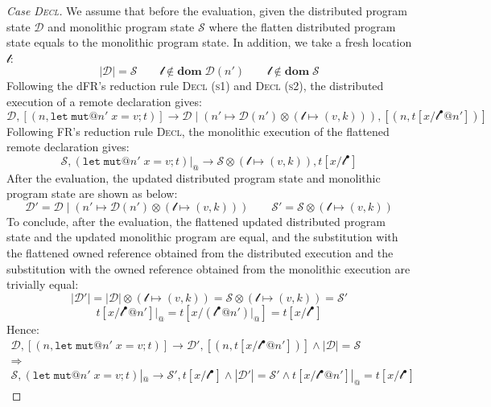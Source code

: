 \begin{proof}[Case \textsc{\emph{Decl}}]
We assume that before the evaluation, given the distributed program state $\mathcal{D}$ and monolithic program state $\mathcal{S}$ where the flatten distributed program state equals to the monolithic program state. In addition, we take a fresh location $\mathscr{l}$:
\[
|\mathcal{D}| = \mathcal{S} \quad\quad \mathscr{l} \notin \textbf{dom}\; \mathcal{D}(n') \quad\quad \mathscr{l} \notin \textbf{dom}\; \mathcal{S}
\]
Following the dFR's reduction rule \textsc{Decl (s1)} and \textsc{Decl (s2)}, the distributed execution of a remote declaration gives:
\[
\mathcal{D}, [(n, \texttt{let}\;\texttt{mut}@n'\;x = v;t)] \longrightarrow \mathcal{D} \mid (n' \mapsto \mathcal{D}(n')\otimes(\mathscr{l} \mapsto (v, k))), [(n, t[x/\mathscr{l}^\bullet@n'])]
\]
Following FR's reduction rule \textsc{Decl}, the monolithic execution of the flattened remote declaration gives:
\[
\mathcal{S}, (\texttt{let}\;\texttt{mut}@n'\;x = v;t)|_@ \longrightarrow \mathcal{S} \otimes (\mathscr{l} \mapsto (v, k)), t[x/\mathscr{l}^\bullet]
\]
After the evaluation, the updated distributed program state and monolithic program state are shown as below:
\[
\mathcal{D}' = \mathcal{D} \mid (n' \mapsto \mathcal{D}(n')\otimes(\mathscr{l} \mapsto (v, k))) \quad\quad
\mathcal{S}' = \mathcal{S} \otimes (\mathscr{l} \mapsto (v, k))
\]
To conclude, after the evaluation, the flattened updated distributed program state and the updated monolithic program are equal, and the substitution with the flattened owned reference obtained from the distributed execution and the substitution with the owned reference obtained from the monolithic execution are trivially equal:
\[
|\mathcal{D}'| = |\mathcal{D}| \otimes (\mathscr{l} \mapsto (v, k)) = \mathcal{S} \otimes (\mathscr{l} \mapsto (v, k)) = \mathcal{S}'\]\[ t[x/\mathscr{l}^\bullet@n']|_@ = t[x/(\mathscr{l}^\bullet@n')|_@] = t[x/\mathscr{l}^\bullet]
\]
Hence:
\begin{gather*}
\mathcal{D}, [(n, \texttt{let}\;\texttt{mut}@n'\;x = v;t)] \longrightarrow \mathcal{D'}, [(n, t[x/\mathscr{l}^\bullet@n'])] \land |\mathcal{D}| = \mathcal{S} \\\Rightarrow\\ \mathcal{S}, (\texttt{let}\;\texttt{mut}@n'\;x = v;t)|_@ \longrightarrow \mathcal{S'}, t[x/\mathscr{l}^\bullet] \land |\mathcal{D}'| = \mathcal{S}' \land t[x/\mathscr{l}^\bullet@n']|_@ = t[x/\mathscr{l}^\bullet]
\end{gather*}

\end{proof}
